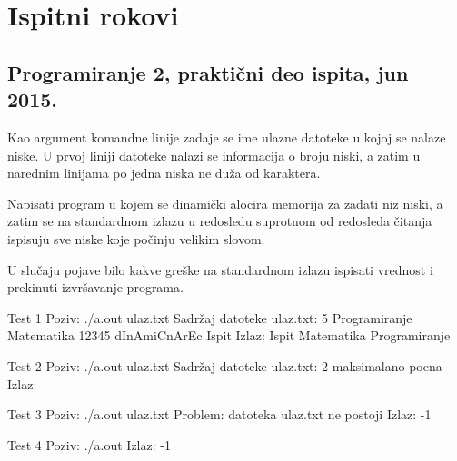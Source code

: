 
\chapter{Ispitni rokovi}


\section{Programiranje 2, praktični deo ispita, jun 2015.}


\begin{Exercise}[label=901]

Kao argument komandne linije zadaje se ime ulazne datoteke u kojoj se nalaze niske. U prvoj liniji datoteke nalazi se informacija o broju niski, a zatim u narednim linijama po jedna niska ne duža od  karaktera.
  
Napisati program u kojem se dinamički alocira memorija za zadati niz niski, a zatim se na standardnom izlazu u redosledu suprotnom od redosleda čitanja ispisuju sve niske koje počinju velikim slovom. 

U slučaju pojave bilo kakve greške na standardnom izlazu ispisati vrednost  i prekinuti izvršavanje programa.

\begin{minitest}
\begin{test}{Test 1}
Poziv: ./a.out ulaz.txt
Sadržaj datoteke ulaz.txt:  
 5                             
 Programiranje	                               
 Matematika		                         
 12345
 dInAmiCnArEc
 Ispit
Izlaz:           
 Ispit                                                                
 Matematika
 Programiranje
\end{test}
\end{minitest}
\begin{minitest}
\begin{test}{Test 2}
Poziv: ./a.out ulaz.txt
Sadržaj datoteke ulaz.txt:                
  2                                             
  maksimalano               
  poena
Izlaz: 
\end{test}
\end{minitest}

\begin{minitest}
\begin{test}{Test 3}
Poziv: ./a.out ulaz.txt
Problem: datoteka 
ulaz.txt ne postoji
Izlaz:    
  -1       
\end{test}
\end{minitest}
\begin{minitest}
\begin{test}{Test 4}
Poziv: ./a.out 
Izlaz:    
  -1       
\end{test}
\end{minitest}
\end{Exercise}
\begin{Answer}[ref=901]
\end{Answer}


